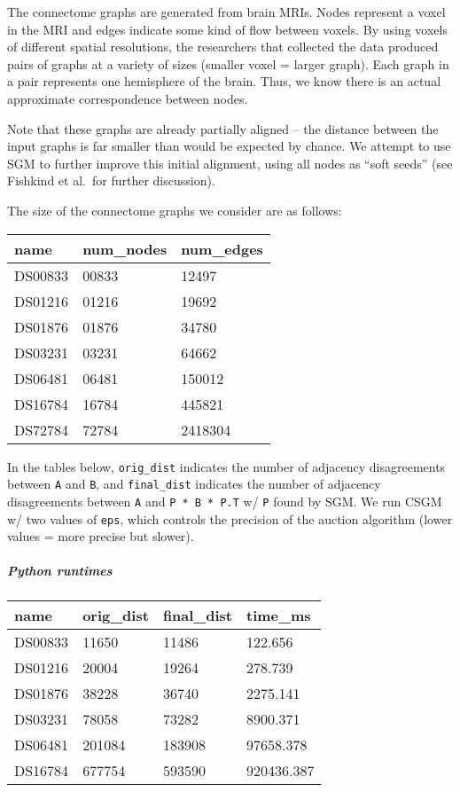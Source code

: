 \documentclass[10pt,oneside]{memoir}
\let\oldsubparagraph\subparagraph
\renewcommand{\subparagraph}[1]{\oldsubparagraph{#1}\mbox{}}
\begin{document}
The connectome graphs are generated from brain MRIs. Nodes represent a
voxel in the MRI and edges indicate some kind of flow between voxels. By
using voxels of different spatial resolutions, the researchers that
collected the data produced pairs of graphs at a variety of sizes
(smaller voxel = larger graph). Each graph in a pair represents one
hemisphere of the brain. Thus, we know there is an actual approximate
correspondence between nodes.

Note that these graphs are already partially aligned -- the distance
between the input graphs is far smaller than would be expected by
chance. We attempt to use SGM to further improve this initial alignment,
using all nodes as ``soft seeds'' (see Fishkind et al.~for further
discussion).

The size of the connectome graphs we consider are as follows:

\begin{longtable}[]{@{}lll@{}}
\toprule
name & num\_nodes & num\_edges\tabularnewline
\midrule
\endhead
DS00833 & 00833 & 12497\tabularnewline
DS01216 & 01216 & 19692\tabularnewline
DS01876 & 01876 & 34780\tabularnewline
DS03231 & 03231 & 64662\tabularnewline
DS06481 & 06481 & 150012\tabularnewline
DS16784 & 16784 & 445821\tabularnewline
DS72784 & 72784 & 2418304\tabularnewline
\bottomrule
\end{longtable}

In the tables below, \texttt{orig\_dist} indicates the number of
adjacency disagreements between \texttt{A} and \texttt{B}, and
\texttt{final\_dist} indicates the number of adjacency disagreements
between \texttt{A} and \texttt{P\ *\ B\ *\ P.T} w/ \texttt{P} found by
SGM. We run CSGM w/ two values of \texttt{eps}, which controls the
precision of the auction algorithm (lower values = more precise but
slower).

\hypertarget{python-runtimes}{%
\subparagraph{Python runtimes}\label{python-runtimes}}

\begin{longtable}[]{@{}llll@{}}
\toprule
name & orig\_dist & final\_dist & time\_ms\tabularnewline
\midrule
\endhead
DS00833 & 11650 & 11486 & 122.656\tabularnewline
DS01216 & 20004 & 19264 & 278.739\tabularnewline
DS01876 & 38228 & 36740 & 2275.141\tabularnewline
DS03231 & 78058 & 73282 & 8900.371\tabularnewline
DS06481 & 201084 & 183908 & 97658.378\tabularnewline
DS16784 & 677754 & 593590 & 920436.387\tabularnewline
\bottomrule
\end{longtable}
\end{document}

